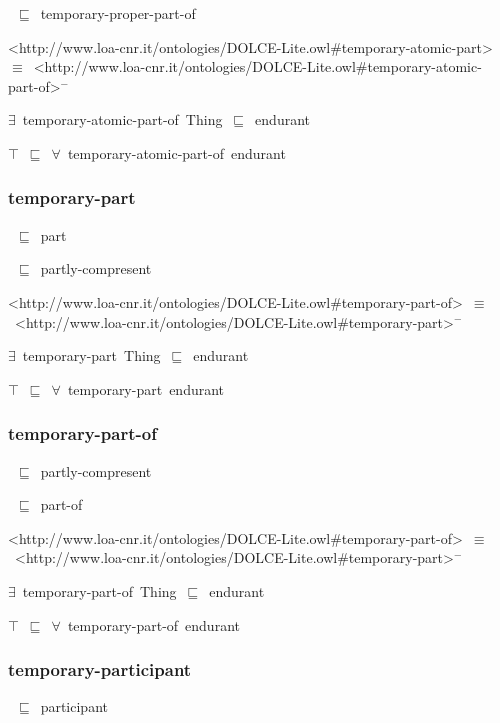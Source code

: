 \documentclass{article}
\begin{document}
~\ensuremath{\sqsubseteq}~temporary-proper-part-of

<http://www.loa-cnr.it/ontologies/DOLCE-Lite.owl#temporary-atomic-part>~\ensuremath{\equiv}~<http://www.loa-cnr.it/ontologies/DOLCE-Lite.owl#temporary-atomic-part-of>\ensuremath{^-}

\ensuremath{\exists}~temporary-atomic-part-of~Thing~\ensuremath{\sqsubseteq}~endurant

\ensuremath{\top}~\ensuremath{\sqsubseteq}~\ensuremath{\forall}~temporary-atomic-part-of~endurant

\subsubsection*{temporary-part}

~\ensuremath{\sqsubseteq}~part

~\ensuremath{\sqsubseteq}~partly-compresent

<http://www.loa-cnr.it/ontologies/DOLCE-Lite.owl#temporary-part-of>~\ensuremath{\equiv}~<http://www.loa-cnr.it/ontologies/DOLCE-Lite.owl#temporary-part>\ensuremath{^-}

\ensuremath{\exists}~temporary-part~Thing~\ensuremath{\sqsubseteq}~endurant

\ensuremath{\top}~\ensuremath{\sqsubseteq}~\ensuremath{\forall}~temporary-part~endurant

\subsubsection*{temporary-part-of}

~\ensuremath{\sqsubseteq}~partly-compresent

~\ensuremath{\sqsubseteq}~part-of

<http://www.loa-cnr.it/ontologies/DOLCE-Lite.owl#temporary-part-of>~\ensuremath{\equiv}~<http://www.loa-cnr.it/ontologies/DOLCE-Lite.owl#temporary-part>\ensuremath{^-}

\ensuremath{\exists}~temporary-part-of~Thing~\ensuremath{\sqsubseteq}~endurant

\ensuremath{\top}~\ensuremath{\sqsubseteq}~\ensuremath{\forall}~temporary-part-of~endurant

\subsubsection*{temporary-participant}

~\ensuremath{\sqsubseteq}~participant
\end{document}
